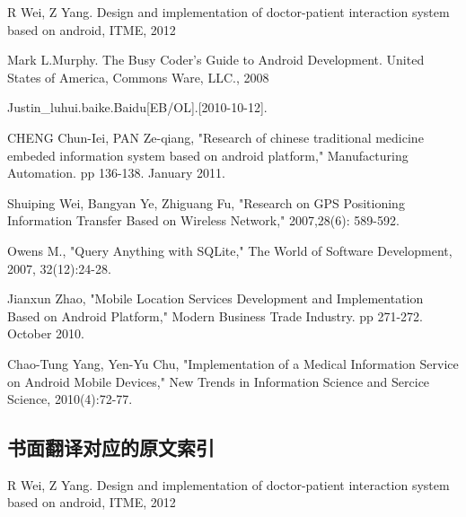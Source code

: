 \begin{enumerate}[{$[$}1{$]$}]
\item R Wei, Z Yang. Design and implementation of doctor-patient interaction system based on android, ITME, 2012
\item Mark L.Murphy. The Busy Coder's Guide to Android Development. United States of America, Commons Ware, LLC., 2008
\item Justin\_luhui.baike.Baidu[EB/OL].[2010-10-12].
\item CHENG Chun-Iei, PAN Ze-qiang, "Research of chinese traditional medicine embeded information system based on android platform," Manufacturing Automation. pp 136-138. January 2011.
\item Shuiping Wei, Bangyan Ye, Zhiguang Fu, "Research on GPS Positioning Information Transfer Based on Wireless Network," 2007,28(6): 589-592.
\item Owens M., "Query Anything with SQLite," The World of Software Development, 2007, 32(12):24-28.
\item Jianxun Zhao, "Mobile Location Services Development and Implementation Based on Android Platform," Modern Business Trade Industry. pp 271-272. October 2010.
\item Chao-Tung Yang, Yen-Yu Chu, "Implementation of a Medical Information Service on Android Mobile Devices," New Trends in Information Science and Sercice Science, 2010(4):72-77.
\end{enumerate}

\begin{center}
\section*{书面翻译对应的原文索引}
\end{center}

\begin{enumerate}[{$[$}1{$]$}]
\item R Wei, Z Yang. Design and implementation of doctor-patient interaction system based on android, ITME, 2012
\end{enumerate}
